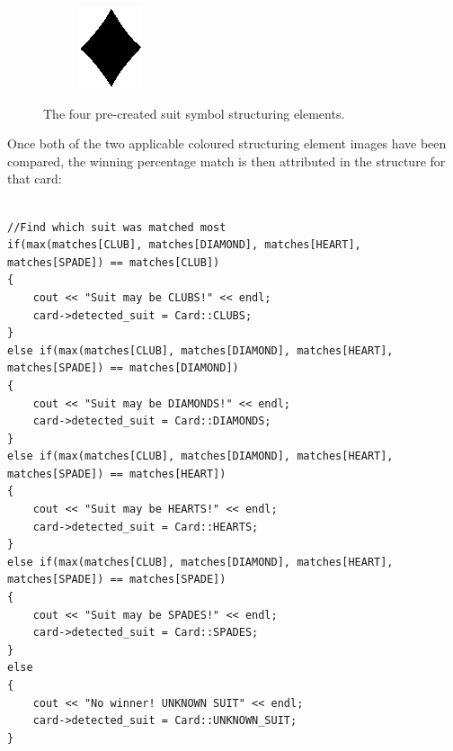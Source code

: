 \documentclass[a4paper,12pt,notitlepage]{article}
\begin{document}
\begin{figure}[H]
\begin{subfigure}[b]{0.15\textwidth}
				\caption{}
			\end{subfigure}
			\begin{subfigure}[b]{0.15\textwidth}
				\centering
				\includegraphics[width=\textwidth]{chris/image31}
				\caption{}
			\end{subfigure}
			\caption{The four pre-created suit symbol structuring elements.}
			\label{fig:structelems}
		\end{figure}

		Once both of the two applicable coloured structuring element images have been compared, the winning percentage match is then attributed in the structure for that card:

		\begin{lstlisting}

//Find which suit was matched most
if(max(matches[CLUB], matches[DIAMOND], matches[HEART], matches[SPADE]) == matches[CLUB])
{
    cout << "Suit may be CLUBS!" << endl;
    card->detected_suit = Card::CLUBS;  
}
else if(max(matches[CLUB], matches[DIAMOND], matches[HEART], matches[SPADE]) == matches[DIAMOND])
{
    cout << "Suit may be DIAMONDS!" << endl;
    card->detected_suit = Card::DIAMONDS;
}
else if(max(matches[CLUB], matches[DIAMOND], matches[HEART], matches[SPADE]) == matches[HEART])
{
    cout << "Suit may be HEARTS!" << endl;
    card->detected_suit = Card::HEARTS;
}
else if(max(matches[CLUB], matches[DIAMOND], matches[HEART], matches[SPADE]) == matches[SPADE])
{
    cout << "Suit may be SPADES!" << endl;
    card->detected_suit = Card::SPADES;
}
else
{
    cout << "No winner! UNKNOWN SUIT" << endl;
    card->detected_suit = Card::UNKNOWN_SUIT;
}
		\end{lstlisting}
\end{document}
